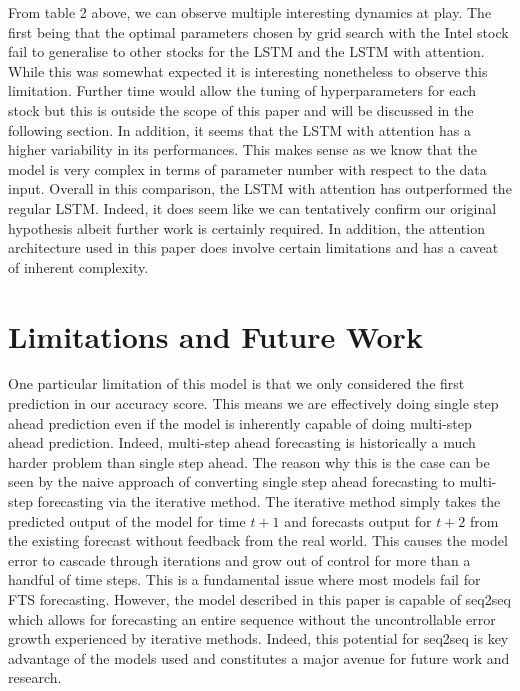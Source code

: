 \documentclass{article}
\begin{document}
From table 2 above, we can observe multiple interesting dynamics at play. The first being that the optimal parameters chosen by grid search with the Intel stock fail to generalise to other stocks for the LSTM and the LSTM with attention. While this was somewhat expected it is interesting nonetheless to observe this limitation. Further time would allow the tuning of hyperparameters for each stock but this is outside the scope of this paper and will be discussed in the following section. In addition, it seems that the LSTM with attention has a higher variability in its performances. This makes sense as we know that the model is very complex in terms of parameter number with respect to the data input. Overall in this comparison, the LSTM with attention has outperformed the regular LSTM. Indeed, it does seem like we can tentatively confirm our original hypothesis albeit further work is certainly required. In addition, the attention architecture used in this paper does involve certain limitations and has a caveat of inherent complexity. 

\section{Limitations and Future Work}

One particular limitation of this model is that we only considered the first prediction in our accuracy score. This means we are effectively doing single step ahead prediction even if the model is inherently capable of doing multi-step ahead prediction. Indeed, multi-step ahead forecasting is historically a much harder problem than single step ahead. The reason why this is the case can be seen by the naive approach of converting single step ahead forecasting to multi-step forecasting via the iterative method. The iterative method simply takes the predicted output of the model for time $t+1$ and forecasts output for $t+2$ from the existing forecast without feedback from the real world. This causes the model error to cascade through iterations and grow out of control for more than a handful of time steps. This is a fundamental issue where most models fail for FTS forecasting. However, the model described in this paper is capable of seq2seq which allows for forecasting an entire sequence without the uncontrollable error growth experienced by iterative methods. Indeed, this potential for seq2seq is key advantage of the models used and constitutes a major avenue for future work and research. 
\end{document}
